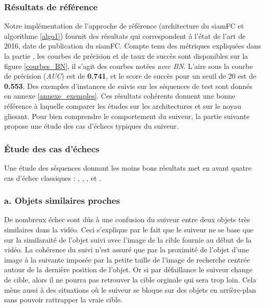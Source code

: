 \documentclass[10pt,twocolumn,letterpaper,french]{article}
\begin{document}
\subsubsection*{Résultats de référence}

Notre implémentation de l'approche de référence (architecture du siamFC \cite{siamfc} et algorithme \ref{algo1}) fournit des résultats qui correspondent à l'état de l'art de 2016, date de publication du siamFC. Compte tenu des métriques expliquées dans la partie \textit{}, les courbes de précision et de taux de succès sont disponibles sur la figure \ref{courbes_BN}, il s'agit des courbes notées \textit{avec BN}. L'aire sous la courbe de précision (\textit{AUC}) est de \textbf{0.741}, et le score de succès pour un seuil de 20 est de \textbf{0.553}. Des exemples d'instances de suivis sur les séquences de test sont donnés en annexe \ref{annexe_exemples}. Ces résultats cohérents donnent une bonne référence à laquelle comparer les études sur les architectures et sur le noyau glissant. Pour bien comprendre le comportement du suiveur, la partie suivante propose une étude des cas d'échecs typiques du suiveur.

\subsubsection*{Étude des cas d'échecs}
\label{echecs}

Une étude des séquences donnant les moins bons résultats met en avant quatre cas d'échec classiques : \textit{}, \textit{}, \textit{}, et \textit{}.


\subsubsection*{a. Objets similaires proches}
\label{proches}

De nombreux échec sont dûs à une confusion du suiveur entre deux objets très similaires dans la vidéo. Ceci s'explique par le fait que le suiveur ne se base que sur la similaraité de l'objet suivi avec l'image de la cible fournie au début de la vidéo. La cohérence du suivi n'est assuré que par la proximité de l'objet d'une image à la suivante imposée par la petite taille de l'image de recherche centrée autour de la dernière position de l'objet. Or si par défaillance le suiveur change de cible, alors il ne pourra pas retrouver la cible orginale qui sera trop loin. Cela mène aussi à des situations où le suiveur se bloque sur des objets en arrière-plan sans pouvoir rattrapper la vraie cible.
\end{document}
